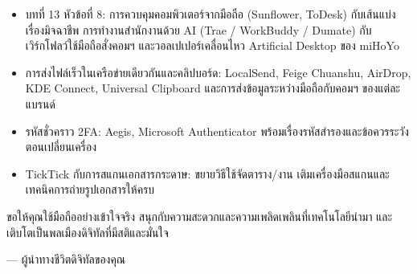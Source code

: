 
\begin{itemize}
  \item บทที่ 13 หัวข้อที่ 8: การควบคุมคอมพิวเตอร์จากมือถือ (Sunflower, ToDesk) กับเส้นแบ่งเรื่องมิจฉาชีพ การทำงานสำนักงานด้วย AI (Trae / WorkBuddy / Dumate) กับเวิร์กโฟลว์ใช้มือถือสั่งคอมฯ และวอลเปเปอร์เคลื่อนไหว Artificial Desktop ของ miHoYo
  \item การส่งไฟล์เร็วในเครือข่ายเดียวกันและคลิปบอร์ด: LocalSend, Feige Chuanshu, AirDrop, KDE Connect, Universal Clipboard และการส่งข้อมูลระหว่างมือถือกับคอมฯ ของแต่ละแบรนด์
  \item รหัสชั่วคราว 2FA: Aegis, Microsoft Authenticator พร้อมเรื่องรหัสสำรองและข้อควรระวังตอนเปลี่ยนเครื่อง
  \item TickTick กับการสแกนเอกสารกระดาษ: ขยายวิธีใช้จัดตาราง/งาน เติมเครื่องมือสแกนและเทคนิคการถ่ายรูปเอกสารให้ครบ
\end{itemize}

ขอให้คุณใช้มือถืออย่างเข้าใจจริง สนุกกับความสะดวกและความเพลิดเพลินที่เทคโนโลยีนำมา และเติบโตเป็นพลเมืองดิจิทัลที่มีสติและมั่นใจ

— ผู้นำทางชีวิตดิจิทัลของคุณ
